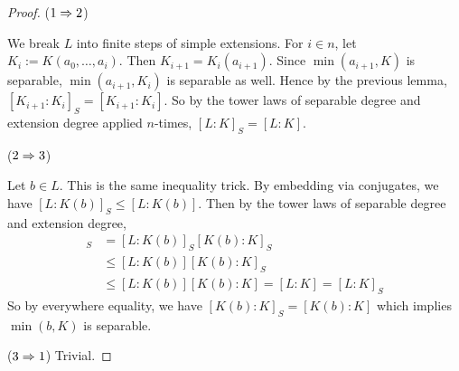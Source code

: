 \documentclass[../book.tex]{subfiles}
\begin{document}
\begin{proof}
    ($1\Rightarrow 2$)
        
        We break $L$ into finite steps of simple extensions. 
        For $i\in n$, let $K_i := K(a_0,\dots,a_i)$.
        Then $K_{i+1} = K_i(a_{i+1})$. 
        Since $\min(a_{i+1},K)$ is separable, $\min(a_{i+1},K_i)$ is separable as well. 
        Hence by the previous lemma, $[K_{i+1}:K_i]_S = [K_{i+1}:K_i]$. 
        So by the tower laws of separable degree and extension degree applied $n$-times, 
        $[L : K]_S = [L : K]$. 
        
    ($2\Rightarrow 3$)
        
        Let $b \in L$. 
        This is the same inequality trick.
        By embedding via conjugates, we have 
        $[L : K(b)]_S \leq [L : K(b)]$. 
        Then by the tower laws of separable degree and extension degree,
        \begin{align*}
            [L : K]_S &= [L : K(b)]_S [K(b) : K]_S \\
            &\leq [L : K(b)] [K(b) : K]_S \\
            &\leq [L : K(b)] [K(b) : K] = [L : K] = [L : K]_S 
        \end{align*}
        So by everywhere equality, we have $[K(b) : K]_S = [K(b) : K]$
        which implies $\min(b,K)$ is separable. 
        
    ($3\Rightarrow 1$)
        Trivial. 
\end{proof}

    
\end{document}
